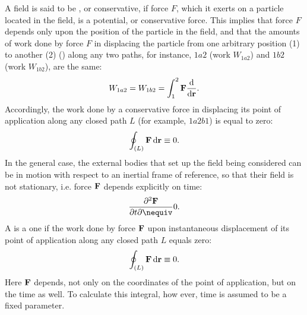 A  field  is said to be , or con­servative, if force $F$, which it exerts on a particle located in the field, is a potential, or conservative force. This implies that force $F$ depends only upon the position of the particle in the field, and that the amounts of work done by force $F$ in displacing the particle from one arbitrary position (1) to ano­ther (2) () along any two paths, for instance, $1a2$ (work
$W_{1a2}$) and $1b2$ (work $W_{1b2}$), are the same:
\begin{equation*}%
W_{1a2} = W_{1b2} = \int_{1}^{2} \vb{F} \dv{\vb{r}} .
\end{equation*}
Accordingly, the work done by a conservative force in displac­ing its point of application along any closed path $L$ (for exam­ple, $1a2b1$) is equal to zero:
\begin{equation*}%
\oint_{(L)} \vb{F} \dd{\vb{r}} \equiv 0.
\end{equation*}
In the general case, the external bodies that set up the field being considered can be in motion with respect to an inertial frame of reference, so that their field is not stationary, i.e. force $\vb{F}$ depends explicitly on time: 
\begin{equation*}%
\pdv{\vb{F}}{t} \nequiv 0.
\end{equation*}
A  is a  one if the work done by force $\vb{F}$ upon instanta­neous displacement of its point of application along any closed path $L$ equals zero:
\begin{equation*}%
\oint_{(L)} \vb{F} \dd{\vb{r}} \equiv 0.
\end{equation*}
Here $\vb{F}$ depends, not only on the coordinates of the point of appli­cation, but on the time as well. To calculate this integral, how­ ever, time is assumed to be a fixed parameter.


